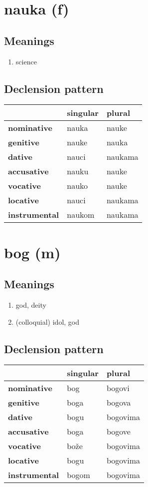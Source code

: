 \filbreak
\section{nauka (f)}
\subsection*{Meanings}
\begin{enumerate}
\item science
\end{enumerate}
\subsection*{Declension pattern}
\begin{tabularx}{\linewidth}{Xll}
\toprule
{} & singular &   plural \\
\midrule
\textbf{nominative  } &    nauka &    nauke \\
\textbf{genitive    } &    nauke &    nauka \\
\textbf{dative      } &    nauci &  naukama \\
\textbf{accusative  } &    nauku &    nauke \\
\textbf{vocative    } &    nauko &    nauke \\
\textbf{locative    } &    nauci &  naukama \\
\textbf{instrumental} &   naukom &  naukama \\
\bottomrule
\end{tabularx}

\filbreak
\section{bog (m)}
\subsection*{Meanings}
\begin{enumerate}
\item god, deity
\item (colloquial) idol, god
\end{enumerate}
\subsection*{Declension pattern}
\begin{tabularx}{\linewidth}{Xll}
\toprule
{} & singular &    plural \\
\midrule
\textbf{nominative  } &      bog &    bogovi \\
\textbf{genitive    } &     boga &    bogova \\
\textbf{dative      } &     bogu &  bogovima \\
\textbf{accusative  } &     boga &    bogove \\
\textbf{vocative    } &     bože &  bogovima \\
\textbf{locative    } &     bogu &  bogovima \\
\textbf{instrumental} &    bogom &  bogovima \\
\bottomrule
\end{tabularx}

